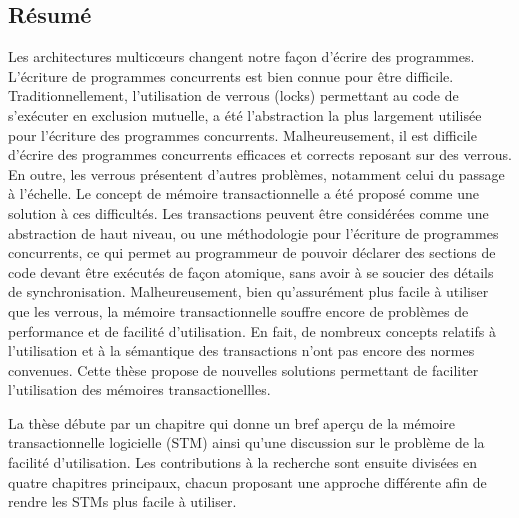 \documentclass[11pt]{book}
\begin{document}
\subsection*{Résumé}


Les architectures multicœurs changent notre façon d'écrire des programmes.
L'écriture de programmes concurrents est bien connue pour être difficile.
Traditionnellement, l'utilisation de verrous (locks) permettant au code de s'exécuter en exclusion mutuelle, 
a été l'abstraction la plus largement utilisée pour l'écriture des programmes concurrents.
Malheureusement, il est
difficile d'écrire des programmes concurrents efficaces et corrects reposant sur des verrous.
En outre, les verrous présentent d'autres problèmes, notamment celui du passage à l'échelle.
Le concept de mémoire transactionnelle a été proposé comme une solution à ces difficultés.
Les transactions peuvent être considérées comme une abstraction de haut niveau, ou une méthodologie pour l'écriture de programmes concurrents, ce qui permet
au programmeur de pouvoir déclarer des sections de code devant être exécutés de façon atomique,
sans avoir à se soucier des détails de synchronisation.
Malheureusement, bien qu'assurément plus facile à utiliser que les verrous, la mémoire
transactionnelle souffre encore de problèmes de performance et de facilité d'utilisation.
En fait, de nombreux concepts relatifs à l'utilisation et à la sémantique des transactions n'ont pas encore des normes convenues.
Cette thèse propose de nouvelles solutions permettant de faciliter l'utilisation des mémoires transactionellles.

La thèse débute par un chapitre qui donne un bref aperçu de la mémoire transactionnelle logicielle (STM) ainsi qu'une discussion sur le problème de la facilité d'utilisation.
Les contributions à la recherche sont ensuite divisées en quatre chapitres principaux, chacun proposant une approche différente afin de rendre les STMs plus facile à utiliser.










% 
\end{document}
